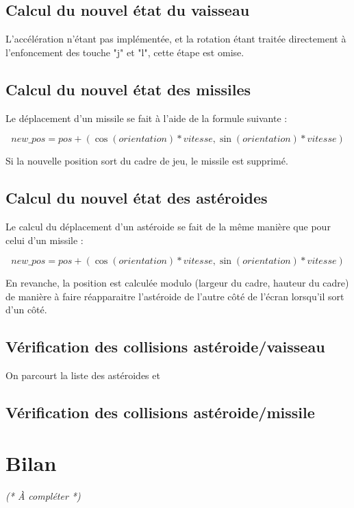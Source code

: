 \documentclass[a4paper,10pt,openany,oneside]{report}
\begin{document}
\subsection{Calcul du nouvel état du vaisseau}

L'accélération n'étant pas implémentée, et la rotation étant traitée
directement à l'enfoncement des touche "j" et "l", cette étape est omise.

\subsection{Calcul du nouvel état des missiles}

Le déplacement d'un missile se fait à l'aide de la formule suivante :

\[new\_pos = pos + (\cos (orientation) * vitesse, \sin(orientation) * vitesse)\]

Si la nouvelle position sort du cadre de jeu, le missile est supprimé.

\subsection{Calcul du nouvel état des astéroides}

Le calcul du déplacement d'un astéroide se fait de la même manière que pour
celui d'un missile :

\[new\_pos = pos + (\cos (orientation) * vitesse, \sin(orientation) * vitesse)\]

En revanche, la position est calculée modulo (largeur du cadre, hauteur du
cadre) de manière à faire réapparaitre l'astéroide de l'autre côté de l'écran
lorsqu'il sort d'un côté.

\subsection{Vérification des collisions astéroide/vaisseau}

On parcourt la liste des astéroides et 

\subsection{Vérification des collisions astéroide/missile}

\section{Bilan}

\textit{(* À compléter *)}
\end{document}
